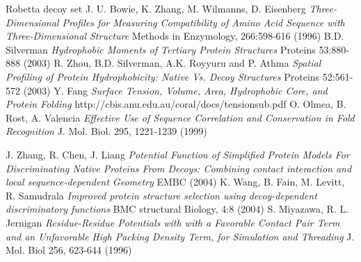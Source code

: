 \documentclass[a4paper,20pt,notitlepage,openbib]{article}
\begin{document}
\begin{thebibliography}{99}
Robetta decoy set
J. U. Bowie, K. Zhang, M. Wilmanns, D. Eisenberg
\emph{Three-Dimensional Profiles for Measuring Compatibility of Amino Acid Sequence with Three-Dimensional Structure}
Methods in Enzymology, 266:598-616 (1996)
B.D. Silverman
\emph{Hydrophobic Moments of Tertiary Protein Structures}
Proteins 53:880-888 (2003)
R. Zhou, B.D. Silverman, A.K. Royyuru and P. Athma
\emph{Spatial Profiling of Protein Hydrophobicity: Native Vs. Decoy Structures}
Proteins 52:561-572 (2003)
Y. Fang
\emph{Surface Tension, Volume, Area, Hydrophobic Core, and Protein Folding}
http://cbis.anu.edu.au/coral/docs/tensionsub.pdf
O. Olmea, B. Rost, A. Valencia
\emph{Effective Use of Sequence Correlation and Conservation in Fold Recognition}
J. Mol. Biol. 295, 1221-1239 (1999)

J. Zhang, R. Chen, J. Liang
\emph{Potential Function of Simplified Protein Models For Discriminating Native Proteins From Decoys: Combining contact interaction and local sequence-dependent Geometry}
EMBC (2004)
K. Wang, B. Fain, M. Levitt, R. Samudrala
\emph{Improved protein structure selection using decoy-dependent discriminatory functions}
BMC structural Biology, 4:8 (2004)
S. Miyazawa, R. L. Jernigan
\emph{Residue-Residue Potentials with with a Favorable Contact Pair Term and an Unfavorable High Packing Density Term, for Simulation and Threading}
J. Mol. Biol 256, 623-644 (1996)


\end{thebibliography}
\end{document}
